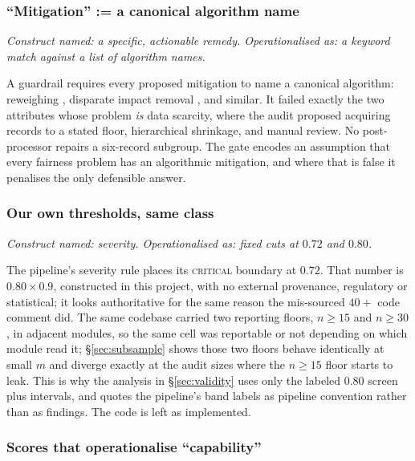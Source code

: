 \documentclass[sigconf,nonacm]{acmart}
\begin{document}
\subsubsection{``Mitigation'' := a canonical algorithm name}
\label{sec:mitigation}

\emph{Construct named: a specific, actionable remedy. Operationalised as: a
keyword match against a list of algorithm names.}

A guardrail requires every proposed mitigation to name a canonical algorithm:
reweighing \citep{kamiran2011}, disparate impact removal
\citep{feldman2015}, and similar. It failed exactly the two attributes whose
problem \emph{is} data scarcity, where the audit proposed acquiring records to
a stated floor, hierarchical shrinkage, and manual review. No post-processor
repairs a six-record subgroup. The gate encodes an assumption that every
fairness problem has an algorithmic mitigation, and where that is false it
penalises the only defensible answer.

\subsubsection{Our own thresholds, same class}
\label{sec:ownthresholds}

\emph{Construct named: severity. Operationalised as: fixed cuts at $0.72$ and
$0.80$.}

The pipeline's severity rule places its \textsc{critical} boundary at $0.72$.
That number is $0.80 \times 0.9$, constructed in this project, with no
external provenance, regulatory or statistical; it looks authoritative for
the same reason the mis-sourced $40{+}$ code comment did. The same codebase
carried two reporting floors, $n \geq 15$ and $n \geq 30$, in adjacent
modules, so the same cell was reportable or not depending on which module
read it; \S\ref{sec:subsample} shows those two floors behave identically at
small $m$
and diverge exactly at the audit sizes where the $n \geq 15$ floor starts to
leak. This is why the analysis in \S\ref{sec:validity} uses only the labeled
$0.80$ screen plus intervals, and quotes the pipeline's band labels as
pipeline convention rather than as findings. The code is left as implemented.

\subsubsection{Scores that operationalise ``capability''}
\label{sec:capability}
\end{document}

